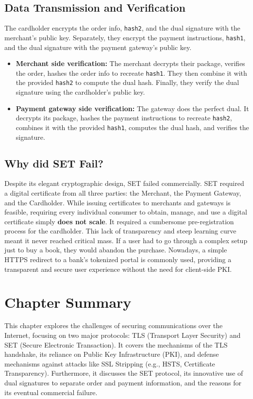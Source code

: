 \subsection{Data Transmission and Verification}
The cardholder encrypts the order info, \texttt{hash2}, and the dual signature with the merchant's public key. Separately, they encrypt the payment instructions, \texttt{hash1}, and the dual signature with the payment gateway's public key.
\begin{itemize}
    \item \textbf{Merchant side verification:} The merchant decrypts their package, verifies the order, hashes the order info to recreate \texttt{hash1}. They then combine it with the provided \texttt{hash2} to compute the dual hash. Finally, they verify the dual signature using the cardholder's public key.
    \item \textbf{Payment gateway side verification:} The gateway does the perfect dual. It decrypts its package, hashes the payment instructions to recreate \texttt{hash2}, combines it with the provided \texttt{hash1}, computes the dual hash, and verifies the signature.
\end{itemize}

\subsection{Why did SET Fail?}
Despite its elegant cryptographic design, SET failed commercially. 
SET required a digital certificate from all three parties: the Merchant, the Payment Gateway, and the Cardholder. While issuing certificates to merchants and gateways is feasible, requiring every individual consumer to obtain, manage, and use a digital certificate simply \textbf{does not scale}. 
It required a cumbersome pre-registration process for the cardholder. This lack of transparency and steep learning curve meant it never reached critical mass. If a user had to go through a complex setup just to buy a book, they would abandon the purchase.
Nowadays, a simple HTTPS redirect to a bank's tokenized portal is commonly used, providing a transparent and secure user experience without the need for client-side PKI.

\section*{Chapter Summary}
This chapter explores the challenges of securing communications over the Internet, focusing on two major protocols: TLS (Transport Layer Security) and SET (Secure Electronic Transaction). It covers the mechanisms of the TLS handshake, its reliance on Public Key Infrastructure (PKI), and defense mechanisms against attacks like SSL Stripping (e.g., HSTS, Certificate Transparency). Furthermore, it discusses the SET protocol, its innovative use of dual signatures to separate order and payment information, and the reasons for its eventual commercial failure.

